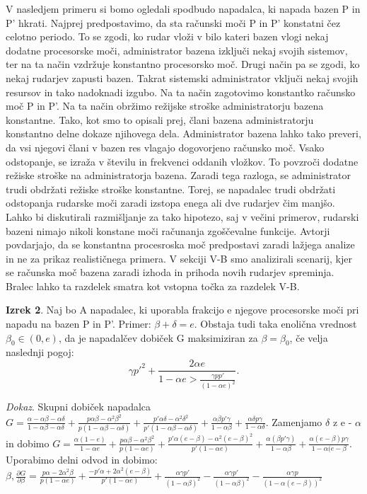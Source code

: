 \documentclass{acm_proc_article-sp}
\begin{document}
V nasledjem primeru si bomo ogledali spodbudo napadalca, ki napada bazen P in P' hkrati. Najprej predpostavimo, da sta računski moči P in P' konstatni čez celotno periodo. To se zgodi, ko rudar vloži v bilo kateri bazen vlogi nekaj dodatne procesorske moči, administrator bazena izključi nekaj svojih sistemov, ter na ta način vzdržuje konstantno procesorsko moč. Drugi način pa se zgodi, ko nekaj rudarjev zapusti bazen. Takrat sistemski administrator vključi nekaj svojih resursov in tako nadoknadi izgubo. Na ta način zagotovimo konstantko računsko moč P in P'. Na ta način obržimo režijske stroške administratorju bazena konstantne. Tako, kot smo to opisali prej, člani bazena administratorju konstantno delne dokaze njihovega dela. Administrator bazena lahko tako preveri, da vsi njegovi člani v bazen res vlagajo dogovorjeno računsko moč. Vsako odstopanje, se izraža v številu in frekvenci oddanih vložkov. To povzroči dodatne režiske stroške na administratorja bazena. Zaradi tega razloga, se administrator trudi obdržati režiske stroške konstantne. Torej, se napadalec trudi obdržati odstopanja rudarske moči zaradi izstopa enega ali dve rudarjev čim manjšo. Lahko bi diskutirali razmišljanje za tako hipotezo, saj v večini primerov, rudarski bazeni nimajo nikoli konstane moči računanja zgoščevalne funkcije. Avtorji povdarjajo, da se konstantna procesroska moč predpostavi zaradi lažjega analize in ne za prikaz realističnega primera. V sekciji V-B smo analizirali scenarij, kjer se računska moč bazena zaradi izhoda in prihoda novih rudarjev spreminja. Bralec lahko ta razdelek smatra kot vstopna točka za razdelek V-B.

\textbf{Izrek 2}. Naj bo A napadalec, ki uporabla frakcijo e njegove procesorske moči pri napadu na bazen P in P'. Primer: $\beta + \delta = e$. Obstaja tudi taka enolična vrednost $\beta_0 \in (0, e)$, da je napadalčev dobiček G maksimiziran za $\beta = \beta_0$, če velja naslednji pogoj:
\begin{equation}
\gamma p'^2 + \frac{2\alpha e}{1 - \alpha e > \frac{\gamma p p'}{(1 - \alpha e)^2}}.
\end{equation}

\textit{Dokaz}. Skupni dobiček napadalca $G = \frac{\alpha - \alpha\beta - \alpha\delta}{1 - \alpha\beta - \alpha\delta} + \frac{p \alpha\beta - \alpha^2\beta^2}{p(1 - \alpha\beta - \alpha\delta)} + \frac{p'\alpha\delta - \alpha^2\delta^2}{p'(1 - \alpha\beta - \alpha\delta)} + \frac{\alpha\beta p' \gamma}{1 - \alpha\beta} + \frac{\alpha\delta p \gamma}{1 - \alpha\delta}$. Zamenjamo $\delta$ z e - $\alpha$ in dobimo $G = \frac{\alpha(1 - e)}{1 - \alpha e} + \frac{p \alpha\beta - \alpha^2\beta^2}{p(1 - \alpha e)} + \frac{p' \alpha(e - \beta) - \alpha^2(e - \beta)^2}{p'(1 - \alpha e)} + \frac{\alpha(\beta p' \gamma)}{1 - \alpha\beta} + \frac{\alpha(e - \beta) p \gamma}{1 - \alpha(e - \beta}$. Uporabimo delni odvod in dobimo: $\beta, \frac{\partial G}{\partial \beta} = \frac{p\alpha - 2\alpha^2\beta}{p(1 - \alpha e)} + \frac{-p' \alpha + 2 \alpha^2(e - \beta)}{p' (1- \alpha e)} + \frac{\alpha\gamma p'}{(1 - \alpha\beta)^2} - \frac{\alpha\gamma p'}{(1 - \alpha\beta)^2} - \frac{\alpha\gamma p}{(1 - \alpha(e - \beta)) ^ 2}$
\end{document}
